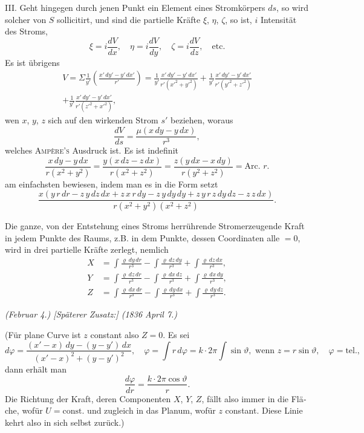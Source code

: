 \documentclass[fontsize=10pt,paper=a5,pagesize=auto]{scrbook}
\newcommand{\origpage}[1]{\marginpar{\footnotesize\textit{S. #1}}}
\begin{document}
\origpage{614}
\textsc{III.} Geht hingegen durch jenen Punkt ein Element eines Stromkörpers $ds$, so wird solcher von $S$ sollicitirt, und sind die partielle Kräfte $\xi$, $\eta$, $\zeta$, so ist, $i$ Intensität des Stroms,
\[
\xi = i \frac{dV}{dx}, \quad \eta = i \frac{dV}{dy}, \quad \zeta = i \frac{dV}{dz}, \quad \text{etc.}
\]
Es ist übrigens
\begin{multline*}
V = \Sigma \frac{1}{y'} \left( \frac{x' \, dy' - y' \, dx'}{r'} \right) = \frac{1}{y'} \frac{x' \, dy' - y' \, dx'}{r'(x'^2 + y'^2)} + \frac{1}{y'} \frac{x' \, dy' - y' \, dx'}{r'(y'^2 + z'^2)}\\
+ \frac{1}{y'} \frac{x' \, dy' - y' \, dx'}{r'(z'^2 + x'^2)},
\end{multline*}
wen $x$, $y$, $z$ sich auf den wirkenden Strom $s'$ beziehen, woraus
\[
\frac{dV}{ds} = \frac{\mu(x \, dy - y \, dx)}{r^3},
\]
welches \textsc{Ampère's} Ausdruck ist. Es ist indefinit
\[
\frac{x \, dy - y \, dx}{r(x^2 + y^2)} = \frac{y(x \, dz - z \, dx)}{r(x^2 + z^2)} = \frac{z(y \, dx - x \, dy)}{r(y^2 + z^2)} = \text{Arc. } r.
\]
am einfachsten bewiesen, indem man es in die Form setzt
\[
\frac{x(y \, r \, dr - z \, y \, dz \, dx + z \, x \, r \, dy - z \, y \, dy \, dy + z \, y \, r \, z \, dy \, dz - z \, z \, dx)}{r(x^2 + y^2)(x^2 + z^2)}.
\]

Die ganze, von der Entstehung eines Stroms herrührende Stromerzeugende Kraft in jedem Punkte des Raums, z.B. in dem Punkte, dessen Coordinaten alle $= 0$, wird in drei partielle Kräfte zerlegt, nemlich
\begin{align*}
X &= \int \frac{\varrho \, dy \, dr}{r^3} - \int \frac{\varrho \, dz \, dy}{r^3} + \int \frac{\varrho \, dz \, dx}{r^3},\\
Y &= \int \frac{\varrho \, dz \, dr}{r^3} - \int \frac{\varrho \, dx \, dz}{r^3} + \int \frac{\varrho \, dx \, dy}{r^3},\\
Z &= \int \frac{\varrho \, dx \, dr}{r^3} - \int \frac{\varrho \, dy \, dx}{r^3} + \int \frac{\varrho \, dy \, dz}{r^3}.
\end{align*}

\begin{otherlanguage}{ngerman}
\textit{(Februar 4.) [Späterer Zusatz:] (1836 April 7.)}

(Für plane Curve ist $z$ constant also $Z = 0$. Es sei
\[
d\varphi = \frac{(x' - x) \, dy - (y - y') \, dx}{(x' - x)^2 + (y - y')^2}, \quad
\varphi = \int r \, d\varphi = k \cdot 2\pi \int \sin\vartheta, \text{ wenn } z = r\sin\vartheta, \quad \varphi = \text{tel.},
\]
dann erhält man
\[
\frac{d\varphi}{dr} = \frac{k \cdot 2\pi \cos\vartheta}{r}.
\]
Die Richtung der Kraft, deren Componenten $X$, $Y$, $Z$, fällt also immer in die Fläche, wofür $U = \mathrm{const.}$ und zugleich in das Planum, wofür $z$ constant. Diese Linie kehrt also in sich selbst zurück.)
\end{otherlanguage}
\end{document}
